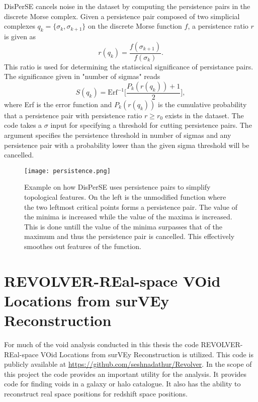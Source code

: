 DisPerSE cancels noise in the dataset by computing the persistence pairs
in the discrete Morse complex. Given a persistence pair composed of two
simplicial complexes $q_k=\{\sigma_k,\sigma_{k+1}\}$ on the discrete Morse
function $f$, a persistence ratio $r$ is given as
\begin{equation}
    r(q_k)=\frac{f(\sigma_{k+1})}{f(\sigma_k)}.
\end{equation}
This ratio is used for determining the statiscical significance of persistance
pairs. The significance given in "number of sigmas" reads 
\begin{equation}
    S(q_k)=\mathrm{Erf}^{-1}\Big[\frac{P_k(r(q_k))+1}{2}\Big],
\end{equation}
where Erf is the error function and $P_k(r(q_k))$ is the cumulative probability
that a persistence pair with persistence ratio $r\geq r_0$ exists in the
dataset. The code takes a $\sigma$ input for specifying a threshold for cutting
persistence pairs. The argument specifies the persistence threshold in number of
sigmas and any persistence pair with a probability lower than the given sigma
threshold will be cancelled.


\begin{figure}
   \texttt{[image: persistence.png]}
   \caption{Example on how DisPerSE uses persistence pairs to simplify topological features. On the left is the unmodified function where the two leftmost critical points forms a persistence pair. The value of the minima is increased while the value of the maxima is increased. This is done untill the value of the minima surpasses that of the maximum and thus the persistence pair is cancelled. This effectively smoothes out features of the function.}
   \label{fig:persistence}
\end{figure}

\section{REVOLVER-REal-space VOid Locations from surVEy Reconstruction}
For much of the void analysis conducted in this thesis the code
REVOLVER-REal-space VOid Locations from surVEy Reconstruction is utilized. This
code is publicly available at \url{https://github.com/seshnadathur/Revolver}.
In the scope of this project the code provides an important utility for the
analysis. It provides code for finding voids in a galaxy or halo catalogue. It also has the ability
to reconstruct real space positions for redshift space positions.
